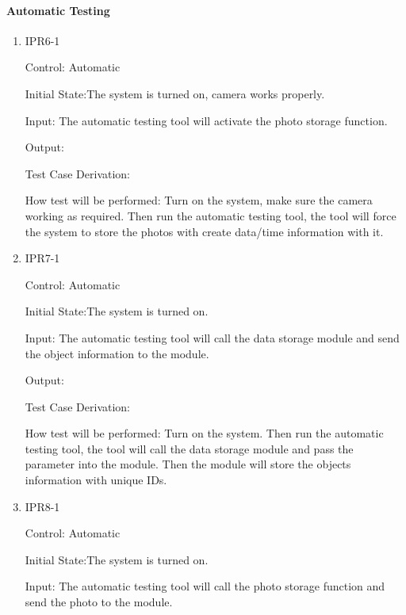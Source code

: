 \documentclass[12pt, titlepage]{article}
\begin{document}
\paragraph{Automatic Testing}

\begin{enumerate}

\item{IPR6-1\\}

Control: Automatic
					
Initial State:The system is turned on, camera works properly. 
					
Input: The automatic testing tool will activate the photo storage function. 
					
Output: 

Test Case Derivation: 
					
How test will be performed:
Turn on the system, make sure the camera working as required. Then run the automatic testing tool, the tool will force the system to store the photos with create data/time information with it.


\item{IPR7-1\\}

Control: Automatic
					
Initial State:The system is turned on.
					
Input: The automatic testing tool will call the data storage module and send the object information to the module. 
					
Output: 

Test Case Derivation: 
					
How test will be performed:
Turn on the system. Then run the automatic testing tool, the tool will call the data storage module and pass the parameter into the module. Then the module will store the objects information with unique IDs.


\item{IPR8-1\\}

Control: Automatic
					
Initial State:The system is turned on.
					
Input: The automatic testing tool will call the photo storage function and send the photo to the module. 
					

\end{enumerate}
\end{document}
